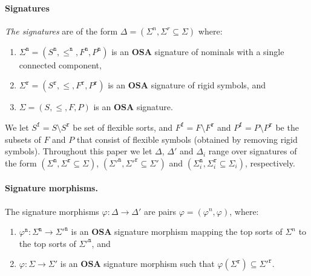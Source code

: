 \documentclass{article}
\newcommand{\OSA}{{\mathbf{OSA}}}
\newcommand{\rigid}{\mathtt{r}}
\newcommand{\flexible}{\mathtt{f}}
\newcommand{\nom}{\mathtt{n}}
\begin{document}
\paragraph{Signatures} 
\emph{The signatures} are of the form $\Delta=(\Sigma^n,\Sigma^r\subseteq \Sigma)$ where:
\begin{enumerate}
\item $\Sigma^\nom=(S^\nom,\leq^\nom,F^\nom,P^\nom)$ is an $\OSA$ signature of nominals with a single connected component,

\item $\Sigma^\rigid=(S^\rigid,\leq, F^\rigid,P^\rigid)$ is an $\OSA$ signature of rigid symbols, and

\item $\Sigma=(S,\leq,F,P)$ is an $\OSA$ signature. 
\end{enumerate}
We let $S^\flexible = S\setminus S^\rigid$ be set of flexible sorts, and $F^\flexible=F\setminus F^\rigid$ and $P^\flexible=P\setminus P^\rigid$ be the subsets of $F$ and $P$ that consist of flexible symbols (obtained by removing rigid symbols).
Throughout this paper we let $\Delta$, $\Delta'$ and $\Delta_i$ range over signatures of the form $(\Sigma^\nom,\Sigma^\rigid\subseteq\Sigma)$, $(\Sigma'^\nom,\Sigma'^\rigid\subseteq \Sigma')$ and $(\Sigma^\nom_i,\Sigma^\rigid_i\subseteq \Sigma_i)$, respectively.

\paragraph{Signature morphisms.}
The signature morphisms $\varphi:\Delta\to \Delta'$ are pairs $\varphi=(\varphi^n,\varphi)$, where:
\begin{enumerate}[leftmargin=1.5em,nosep,label=\alph*)]
 \item $\varphi^\nom:\Sigma^\nom\to\Sigma'^\nom$ is an $\OSA$  signature morphism mapping the top sorts of $\Sigma^n$ to the top sorts of $\Sigma'^\nom$, and

 \item $\varphi:\Sigma\to\Sigma'$ is an $\OSA$ signature morphism such that $\varphi(\Sigma^\rigid)\subseteq \Sigma'^\rigid$.
\end{enumerate}
\end{document}
